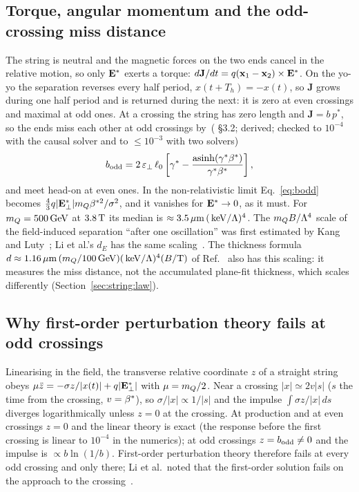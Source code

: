 \subsection{Torque, angular momentum and the odd-crossing miss distance}\label{sec:string:b}
The string is neutral and the magnetic forces on the two ends cancel in the relative motion, so only $\Estar$ exerts a
torque: $d\mathbf J/dt=q(\mathbf x_1-\mathbf x_2)\times\Estar$. On the yo-yo the separation reverses every half
period, $x(t+T_h)=-x(t)$, so $\mathbf J$ grows during one half period and is returned during the next: it is zero at
even crossings and maximal at odd ones. At a crossing the string has zero length and $\mathbf J=b\,p^*$, so the ends
miss each other at odd crossings by~( \S3.2; derived; checked to $10^{-4}$ with the causal solver and to $\le10^{-3}$ with two solvers)
\begin{equation}
  \bodd = 2\,\epsp\,\lzero\left[\gst-\frac{\operatorname{asinh}(\gst\bst)}{\gst\bst}\right],
  \label{eq:bodd}
\end{equation}
and meet head-on at even ones. In the non-relativistic limit Eq.~\eqref{eq:bodd} becomes
$\tfrac43 q|\Estar_\perp|\mQ\beta^{*2}/\sigma^2$, and it vanishes for $\Estar\to0$, as it must. For $\mQ=500\GeV$ at
$3.8\tesla$ its median is $\approx3.5\um\,(\keV/\Lam)^4$. The $\mQ B/\Lam^4$ scale of the field-induced separation
``after one oscillation'' was first estimated by Kang and Luty~\cite[Eq.~(5.64)]{Kang:2008ea}; Li et al.'s $d_E$ has
the same scaling~\cite[Eq.~(V.8)]{Li:2020aoq}. The thickness formula $d\approx1.16\um\,(\mQ/100\GeV)(\keV/\Lam)^4(B/\mathrm
T)$ of Ref.~\cite[Eq.~(III.12)]{Li:2019wce} also has this scaling: it measures the miss distance, not the accumulated
plane-fit thickness, which scales differently (Section~\ref{sec:string:law}).

\subsection{Why first-order perturbation theory fails at odd crossings}\label{sec:string:breakdown}
Linearising in the field, the transverse relative coordinate $z$ of a straight string obeys
$\mu\ddot z=-\sigma z/|x(t)|+q|\Estar_\perp|$ with $\mu=\mQ/2$. Near a crossing $|x|\simeq2v|s|$ ($s$ the time from the
crossing, $v=\bst$), so $\sigma/|x|\propto1/|s|$ and the impulse $\int\sigma z/|x|\,ds$ diverges logarithmically unless
$z=0$ at the crossing. At production and at even crossings $z=0$ and the linear theory is exact (the response before
the first crossing is linear to $10^{-4}$ in the numerics); at odd crossings $z=\bodd\neq0$ and the impulse is
$\propto b\ln(1/b)$. First-order perturbation theory therefore fails at every odd crossing and only there; Li et al.\
noted that the first-order solution fails on the approach to the crossing~\cite[App.~A]{Li:2020aoq}.

